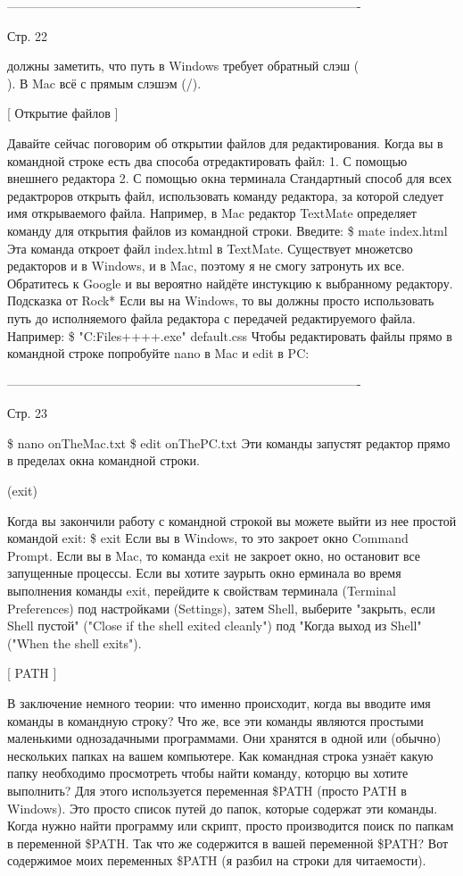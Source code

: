 -------------------------------------------------------------------------------------

Стр. 22

должны заметить, что путь в Windows требует обратный слэш
(\\). В Mac всё с прямым слэшэм (/).

[ Открытие файлов ]

Давайте сейчас поговорим об открытии файлов для редактирования. Когда вы в командной
строке есть два способа отредактировать файл:
    1. С помощью внешнего редактора
    2. С помощью окна терминала
Стандартный способ для всех редактроров открыть файл, использовать команду редактора,
за которой следует имя открываемого файла. Например, в Mac редактор TextMate 
определяет команду для открытия файлов из командной строки. Введите:
\$ mate index.html
Эта команда откроет файл index.html в TextMate. Существует множетсво редакторов и в
Windows, и в Mac, поэтому я не смогу затронуть их все. Обратитесь к Google и вы 
вероятно найдёте инстукцию к выбранному редактору.
        Подсказка от Rock*
        Если вы на Windows, то вы должны просто использовать путь до исполняемого 
        файла редактора с передачей редактируемого файла. Например: 
        \$ "C:\Program Files\Notepad++\notepad++.exe" default.css
Чтобы редактировать файлы прямо в командной строке попробуйте nano в Mac и edit в PC:

-------------------------------------------------------------------------------------

Стр. 23

\$ nano onTheMac.txt
\$ edit onThePC.txt
Эти команды запустят редактор прямо в пределах окна командной строки.

(exit)

Когда вы закончили работу с командной строкой вы можете выйти из нее простой командой
exit:
\$ exit
Если вы в Windows, то это закроет окно Command Prompt. Если вы в Mac, то команда exit 
не закроет окно, но остановит все запущенные процессы. Если вы хотите заурыть окно 
ерминала во время выполнения команды exit, перейдите к свойствам терминала (Terminal
Preferences) под настройками (Settings), затем Shell, выберите "закрыть, если Shell
пустой" ("Close if the shell exited cleanly") под "Когда выход из Shell" ("When the
shell exits").

[ PATH ]

В заключение немного теории: что именно происходит, когда вы вводите имя команды в 
командную строку? Что же, все эти команды являются простыми маленькими однозадачными
программами. Они хранятся в одной или (обычно) нескольких папках на вашем компьютере.
Как командная строка узнаёт какую папку необходимо просмотреть чтобы найти команду, 
которцю вы хотите выполнить? Для этого используется переменная \$PATH (просто PATH в
Windows). Это просто список путей до папок, которые содержат эти команды. Когда нужно
найти программу или скрипт, просто производится поиск по папкам в переменной \$PATH.
Так что же содержится в вашей переменной \$PATH? Вот содержимое моих переменных 
\$PATH (я разбил на строки для читаемости).
 
